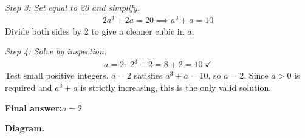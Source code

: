 \documentclass[11pt]{article}
\begin{document}
\textit{Step 3: Set equal to 20 and simplify.}
\[\begin{gathered}
2a^3 + 2a = 20 \implies a^3 + a = 10
\end{gathered}\]
Divide both sides by 2 to give a cleaner cubic in \( a \).

\textit{Step 4: Solve by inspection.}
\[\begin{gathered}
a = 2: \; 2^3 + 2 = 8 + 2 = 10 \;\checkmark
\end{gathered}\]
Test small positive integers. \( a = 2 \) satisfies \( a^3 + a = 10 \), so \( a = 2 \). Since \( a > 0 \) is required and \( a^3 + a \) is strictly increasing, this is the only valid solution.

\begin{answerbox}
\textbf{Final answer:}\quad \(\displaystyle a = 2\)
\end{answerbox}
\textbf{Diagram.}
\end{document}
